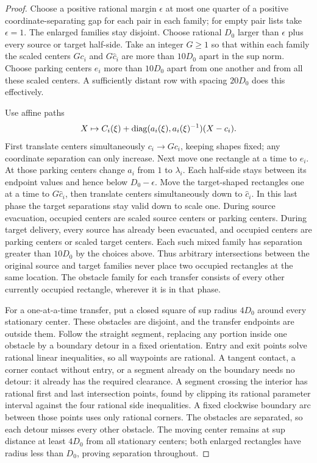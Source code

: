 \begin{proof}
Choose a positive rational margin $\epsilon$ at most one quarter of a
positive coordinate-separating gap for each pair in each family; for
empty pair lists take $\epsilon=1$.  The enlarged families stay disjoint.
Choose rational $D_0$ larger than $\epsilon$ plus every source or target
half-side.  Take an integer $G\ge1$ so that within each family the
scaled centers $Gc_i$ and $G\widehat c_i$ are more than $10D_0$ apart
in the sup norm.  Choose parking centers $e_i$ more than $10D_0$ apart
from one another and from all these scaled centers.  A sufficiently
distant row with spacing $20D_0$ does this effectively.

Use affine paths
\begin{equation}\label{eq:sa-autonomous-moving-box}
 X\mapsto C_i(\xi)+\operatorname{diag}(a_i(\xi),a_i(\xi)^{-1})(X-c_i).
\end{equation}
First translate centers simultaneously $c_i\to Gc_i$, keeping shapes
fixed; any coordinate separation can only increase.  Next move one
rectangle at a time to $e_i$.  At those parking centers change $a_i$
from $1$ to $\lambda_i$.  Each half-side stays between its endpoint
values and hence below $D_0-\epsilon$.  Move the target-shaped rectangles
one at a time to $G\widehat c_i$, then translate centers simultaneously
down to $\widehat c_i$.  In this last phase the target separations stay
valid down to scale one.
During source evacuation, occupied centers are scaled source centers or
parking centers. During target delivery, every source has already been
evacuated, and occupied centers are parking centers or scaled target
centers. Each such mixed family has separation greater than $10D_0$ by
the choices above. Thus arbitrary intersections between the original
source and target families never place two occupied rectangles at the
same location. The obstacle family for each transfer consists of every
other currently occupied rectangle, wherever it is in that phase.

For a one-at-a-time transfer, put a closed square of sup radius $4D_0$
around every stationary center.  These obstacles are disjoint, and the
transfer endpoints are outside them.  Follow the straight segment, replacing
any portion inside one obstacle by a boundary detour in a fixed orientation.
Entry and exit points solve rational linear inequalities, so all waypoints
are rational.  A tangent contact, a corner contact without entry, or a segment already
on the boundary needs no detour: it already has the required clearance.
A segment crossing the interior has rational first and last intersection
points, found by clipping its rational parameter interval against the
four rational side inequalities. A fixed clockwise boundary arc between
those points uses only rational corners. The obstacles are separated,
so each detour misses every other obstacle.  The moving center remains at sup distance at least
$4D_0$ from all stationary centers; both enlarged rectangles have radius
less than $D_0$, proving separation throughout.


\end{proof}
